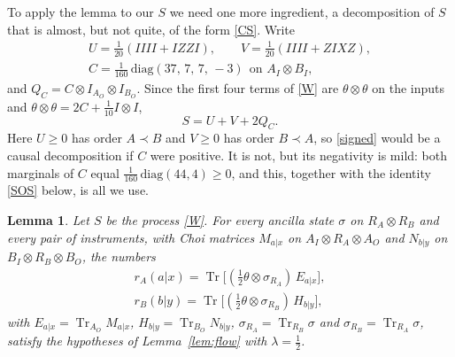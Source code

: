 \documentclass[aps,prl,reprint,superscriptaddress,nofootinbib,longbibliography,raggedbottom]{revtex4-2}
\DeclareMathOperator{\Tr}{Tr}
\newtheorem{lemma}{Lemma}
\begin{document}
To apply the lemma to our $S$ we need one more ingredient, a decomposition
of $S$ that is almost, but not quite, of the form \eqref{CS}. Write
\begin{equation}\label{UVC}
\begin{gathered}
U=\tfrac1{20}(IIII+IZZI),\qquad V=\tfrac1{20}(IIII+ZIXZ),\\
C=\tfrac1{160}\,\mathrm{diag}(37,\,7,\,7,\,-3)\ \ \text{on }A_I\otimes B_I,
\end{gathered}
\end{equation}
and $Q_C=C\otimes I_{A_O}\otimes I_{B_O}$. Since the first four terms of
\eqref{W} are $\theta\otimes\theta$ on the inputs and
$\theta\otimes\theta=2C+\tfrac1{10}I\otimes I$,
\begin{equation}\label{signed}
S=U+V+2Q_C .
\end{equation}
Here $U\geq0$ has order $A\prec B$ and $V\geq0$ has order $B\prec A$, so
\eqref{signed} would be a causal decomposition if $C$ were positive. It is
not, but its negativity is mild: both marginals of $C$ equal
$\tfrac1{160}\,\mathrm{diag}(44,4)\geq0$, and this, together with the
identity \eqref{SOS} below, is all we use.

\begin{lemma}\label{lem:bound}
Let $S$ be the process \eqref{W}. For every ancilla state $\sigma$ on
$R_A\otimes R_B$ and every pair of instruments, with Choi matrices
$M_{a|x}$ on $A_I\otimes R_A\otimes A_O$ and $N_{b|y}$ on
$B_I\otimes R_B\otimes B_O$, the numbers
\begin{equation}\label{r}
\begin{gathered}
r_A(a|x)=\Tr\bigl[(\tfrac12\theta\otimes\sigma_{R_A})\,E_{a|x}\bigr],\\
r_B(b|y)=\Tr\bigl[(\tfrac12\theta\otimes\sigma_{R_B})\,H_{b|y}\bigr],
\end{gathered}
\end{equation}
with $E_{a|x}=\Tr_{A_O}M_{a|x}$, $H_{b|y}=\Tr_{B_O}N_{b|y}$,
$\sigma_{R_A}=\Tr_{R_B}\sigma$ and $\sigma_{R_B}=\Tr_{R_A}\sigma$, satisfy
the hypotheses of Lemma~\ref{lem:flow} with $\lambda=\tfrac12$.
\end{lemma}
\end{document}
